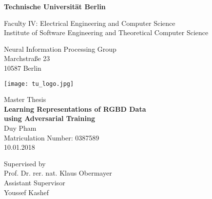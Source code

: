 \thispagestyle{empty}
\begin{center}

\vspace*{1.4cm}
{\LARGE \textbf{Technische Universit{\"a}t Berlin}}

\vspace{0.5cm}

{\large Faculty IV: Electrical Engineering and Computer Science\\[1mm]}
{\large Institute of Software Engineering and Theoretical Computer Science\\[5mm]}

Neural Information Processing Group\\
Marchstra{\ss}e 23\\
10587 Berlin\\

\vspace*{1cm}

\texttt{[image: tu\_logo.jpg]}

\vspace*{1.0cm}

{\LARGE Master Thesis}\\

\vspace{1.0cm}
{\LARGE \textbf{Learning Representations of RGBD Data}}\\
\vspace*{0.3cm}
{\LARGE \textbf{using Adversarial Training}}\\
\vspace*{1.0cm}
{\LARGE Duy Pham}
\\
\vspace*{0.5cm}
Matriculation Number: 0387589\\
10.01.2018\\ %
\vspace*{1.0cm}

Supervised by\\
Prof. Dr. rer. nat. Klaus Obermayer\\
\vspace*{0.5cm}
Assistant Supervisor\\
Youssef Kashef
\vspace{3cm}


\end{center}

